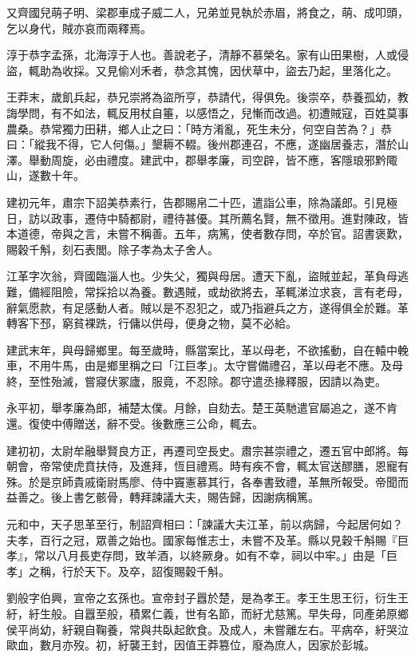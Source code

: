 \begin{pinyinscope}
又齊國兒萌子明、梁郡車成子威二人，兄弟並見執於赤眉，將食之，萌、成叩頭，乞以身代，賊亦哀而兩釋焉。

淳于恭字孟孫，北海淳于人也。善說老子，清靜不慕榮名。家有山田果樹，人或侵盜，輒助為收採。又見偷刈禾者，恭念其愧，因伏草中，盜去乃起，里落化之。

王莽末，歲飢兵起，恭兄崇將為盜所亨，恭請代，得俱免。後崇卒，恭養孤幼，教誨學問，有不如法，輒反用杖自箠，以感悟之，兒慚而改過。初遭賊寇，百姓莫事農桑。恭常獨力田耕，鄉人止之曰：「時方淆亂，死生未分，何空自苦為？」恭曰：「縱我不得，它人何傷。」墾耨不輟。後州郡連召，不應，遂幽居養志，潛於山澤。舉動周旋，必由禮度。建武中，郡舉孝廉，司空辟，皆不應，客隱琅邪黔陬山，遂數十年。

建初元年，肅宗下詔美恭素行，告郡賜帛二十匹，遣詣公車，除為議郎。引見極日，訪以政事，遷侍中騎都尉，禮待甚優。其所薦名賢，無不徵用。進對陳政，皆本道德，帝與之言，未嘗不稱善。五年，病篤，使者數存問，卒於官。詔書褒歎，賜穀千斛，刻石表閭。除子孝為太子舍人。

江革字次翁，齊國臨淄人也。少失父，獨與母居。遭天下亂，盜賊並起，革負母逃難，備經阻險，常採拾以為養。數遇賊，或劫欲將去，革輒涕泣求哀，言有老母，辭氣愿款，有足感動人者。賊以是不忍犯之，或乃指避兵之方，遂得俱全於難。革轉客下邳，窮貧裸跣，行傭以供母，便身之物，莫不必給。

建武末年，與母歸鄉里。每至歲時，縣當案比，革以母老，不欲搖動，自在轅中輓車，不用牛馬，由是鄉里稱之曰「江巨孝」。太守嘗備禮召，革以母老不應。及母終，至性殆滅，嘗寢伏冢廬，服竟，不忍除。郡守遣丞掾釋服，因請以為吏。

永平初，舉孝廉為郎，補楚太僕。月餘，自劾去。楚王英馳遣官屬追之，遂不肯還。復使中傅贈送，辭不受。後數應三公命，輒去。

建初初，太尉牟融舉賢良方正，再遷司空長史。肅宗甚崇禮之，遷五官中郎將。每朝會，帝常使虎賁扶侍，及進拜，恆目禮焉。時有疾不會，輒太官送醪膳，恩寵有殊。於是京師貴戚衛尉馬廖、侍中竇憲慕其行，各奉書致禮，革無所報受。帝聞而益善之。後上書乞骸骨，轉拜諫議大夫，賜告歸，因謝病稱篤。

元和中，天子思革至行，制詔齊相曰：「諫議大夫江革，前以病歸，今起居何如？夫孝，百行之冠，眾善之始也。國家每惟志士，未嘗不及革。縣以見穀千斛賜『巨孝』，常以八月長吏存問，致羊酒，以終厥身。如有不幸，祠以中牢。」由是「巨孝」之稱，行於天下。及卒，詔復賜穀千斛。

劉般字伯興，宣帝之玄孫也。宣帝封子囂於楚，是為孝王。孝王生思王衍，衍生王紆，紆生般。自囂至般，積累仁義，世有名節，而紆尤慈篤。早失母，同產弟原鄉侯平尚幼，紆親自鞠養，常與共臥起飲食。及成人，未嘗離左右。平病卒，紆哭泣歐血，數月亦歿。初，紆襲王封，因值王莽篡位，廢為庶人，因家於彭城。


\end{pinyinscope}

